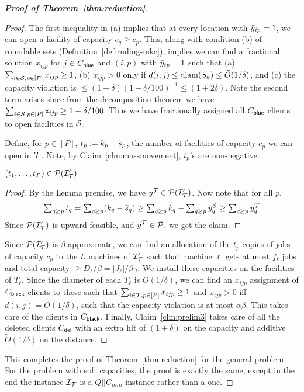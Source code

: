 \begin{proof}[{\bf Proof of Theorem~\ref{thm:reduction}}]
\begin{proof}
The first inequality in (a) implies that at every location with $\bar{y}_{ip} = 1$, we can open a facility of capacity $c_q \geq c_p$. This, along with condition (b) of roundable sets (Definition~\ref{def:rnding-mkc}),
implies we can find a fractional solution $x_{ijp}$ for $j\in C_{\mathsf{blue}}$ and $(i,p)$ with $\bar{y}_{ip} = 1$
such that (a) $\sum_{i\in {\cal S}, p\in [P]} x_{ijp} \geq 1$, (b) $x_{ijp} > 0$ only if $d(i,j) \leq \mathrm{diam}(S_k) \leq \tilde{O}(1/\delta)$, and (c) the capacity violation is $\leq (1+\delta)(1 - \delta/100)^{-1} \leq (1+2\delta)$. Note the second term arises since
from the decomposition theorem we have $\sum_{i\in {\cal S}, p\in [P]} {\mathsf x}_{ijp} \geq 1-\delta/100$.
Thus we have fractionally assigned all $C_{\mathsf{blue}}$ clients to open facilities in ${\cal S}$.


Define, for $p\in [P]$,  $t_p := k_p - \tilde{s}_p$, the number of facilities of capacity $c_p$ we can open in ${\cal T}$. Note, by Claim~\ref{clm:massmovement}, $t_p$'s are non-negative.
%
%
\begin{claim}
	$(t_1,\ldots,t_P) \in {\cal P}({\cal I}'_{\cal T})$
\end{claim}
\begin{proof}
	By the Lemma premise, we have $y^{\cal T} \in {\cal P}({\cal I}'_{\cal T})$. %
	Now note that for all $p$, 
	\[
\textstyle 	\sum_{q\geq p} t_q = \sum_{q\ge p} (k_q - \tilde{s}_q) \ge \sum_{q\ge p} k_q - \sum_{q\geq p} y^{\cal S}_q \geq  \sum_{q\geq p} y^{\cal T}_q 
	\]
	Since ${\cal P}({\cal I}'_{\cal T})$ is upward-feasible, and $y^{\cal T}\in {\cal P}$, we get the claim.
\end{proof}
Since ${\cal P}({\cal I}'_{\cal T})$ is $\beta$-approximate, we can find an allocation of the $t_p$ copies of jobs of capacity $c_p$ to the $L$ machines of ${\cal I}'_{\cal T}$ such that machine $\ell$ gets at most $f_\ell$ jobs and total capacity $\geq D_\ell/\beta = |J_\ell|/\beta\gamma$. We install these capacities on the facilities of $T_\ell$. Since the diameter of each $T_\ell$ is $\tilde{O}(1/\delta)$, we can find an $x_{ijp}$ assignment of $C_{\mathsf{black}}$-clients  to these such that $\sum_{i\in {\cal T},p\in [P]} x_{ijp} \geq 1$ and $x_{ijp} > 0$ iff $d(i,j) = \tilde{O}(1/\delta)$, such that the capacity violation is at most $\alpha\beta$. This takes care of the clients in $C_{\mathsf{black}}$. Finally, Claim~\ref{clm:prelim3} takes care of all the deleted clients $C_{\mathsf{del}}$ with an extra hit of $(1+\delta)$ on the capacity and additive $\tilde{O}(1/\delta)$ on the distance.
\end{proof}
\noindent
This completes the proof of Theorem~\ref{thm:reduction} for the general \mckc problem. For the problem with soft capacities, the proof is exactly the same, except in the end the instance ${\cal I}_{\cal T}$ is a $Q||C_{min}$ instance rather than a \cckp one.
\end{proof}

